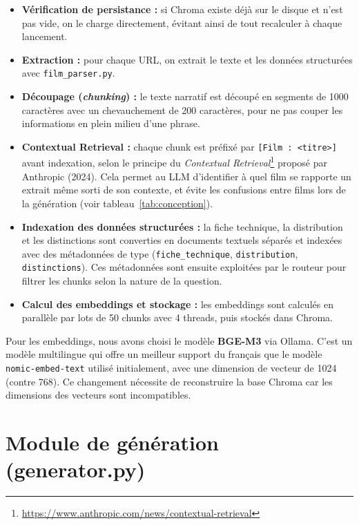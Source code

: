 \documentclass[11pt]{report}
\begin{document}
    \begin{itemize}
        \item \textbf{Vérification de persistance :} si Chroma existe déjà sur le disque et n'est pas vide, on le charge directement, évitant ainsi de tout recalculer à chaque lancement.
        \item \textbf{Extraction :} pour chaque URL, on extrait le texte et les données structurées avec \texttt{film\_parser.py}.
        \item \textbf{Découpage (\textit{chunking}) :} le texte narratif est découpé en segments de 1000 caractères avec un chevauchement de 200 caractères, pour ne pas couper les informations en plein milieu d'une phrase.
        \item \textbf{Contextual Retrieval :} chaque chunk est préfixé par \texttt{[Film : <titre>]} avant indexation, selon le principe du \textit{Contextual Retrieval}\footnote{\url{https://www.anthropic.com/news/contextual-retrieval}} proposé par Anthropic (2024). Cela permet au LLM d'identifier à quel film se rapporte un extrait même sorti de son contexte, et évite les confusions entre films lors de la génération (voir tableau~\ref{tab:conception}).
        \item \textbf{Indexation des données structurées :} la fiche technique, la distribution et les distinctions sont converties en documents textuels séparés et indexées avec des métadonnées de type (\texttt{fiche\_technique}, \texttt{distribution}, \texttt{distinctions}). Ces métadonnées sont ensuite exploitées par le routeur pour filtrer les chunks selon la nature de la question.
        \item \textbf{Calcul des embeddings et stockage :} les embeddings sont calculés en parallèle par lots de 50 chunks avec 4 threads, puis stockés dans Chroma.
    \end{itemize}

    Pour les embeddings, nous avons choisi le modèle \textbf{BGE-M3} via Ollama. C'est un modèle multilingue qui offre un meilleur support du français que le modèle \texttt{nomic-embed-text} utilisé initialement, avec une dimension de vecteur de 1024 (contre 768). Ce changement nécessite de reconstruire la base Chroma car les dimensions des vecteurs sont incompatibles.

    \section{Module de génération (generator.py)}
\end{document}
